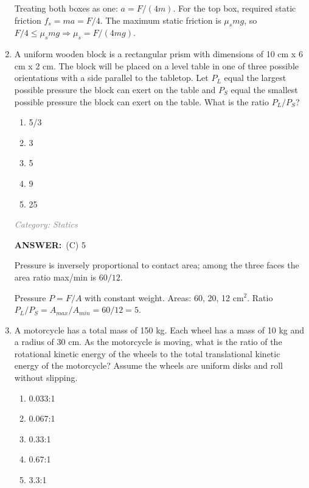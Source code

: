\documentclass[12pt, a4paper]{article}
\makeatletter
\newcommand{\finalanswer}[1]{\textbf{ANSWER:}~#1}
\newif\if@categoryprinted
\newcommand{\category}[1]{\if@categoryprinted\relax\else\textit{\textcolor{gray}{Category: #1}}\global\@categoryprintedtrue\fi}
\newcommand{\tags}[1]{}
\makeatother
\begin{document}
\begin{CJK*}{UTF8}{gbsn}
\begin{enumerate}[itemsep=1.0em, topsep=0.6em]
\begin{solutionbox}
Treating both boxes as one: $a=F/(4m)$. For the top box, required static friction $f_s=m a=F/4$. The maximum static friction is $\mu_s mg$, so $F/4\le \mu_s mg \Rightarrow \mu_s=F/(4mg)$.
\end{solutionbox}

\newpage

\item \label{prob:37}
A uniform wooden block is a rectangular prism with dimensions of 10 cm x 6 cm x 2 cm. The block will be placed on a level table in one of three possible orientations with a side parallel to the tabletop. Let $P_L$ equal the largest possible pressure the block can exert on the table and $P_S$ equal the smallest possible pressure the block can exert on the table. What is the ratio $P_L/P_S$? 
\begin{enumerate}[label=(\Alph*)]
    \item 5/3
    \item 3
    \item 5
    \item 9
    \item 25
\end{enumerate}

\category{Statics} \tags{}
\begin{answerbox}
\finalanswer{(C) 5}
\end{answerbox}
\begin{insightbox}
Pressure is inversely proportional to contact area; among the three faces the area ratio max/min is $60/12$.
\end{insightbox}
\begin{solutionbox}

Pressure $P=F/A$ with constant weight. Areas: 60, 20, 12 cm$^2$. Ratio $P_L/P_S=A_{max}/A_{min}=60/12=5$.
\end{solutionbox}

\item \label{prob:38}
A motorcycle has a total mass of 150 kg. Each wheel has a mass of 10 kg and a radius of 30 cm. As the motorcycle is moving, what is the ratio of the rotational kinetic energy of the wheels to the total translational kinetic energy of the motorcycle? Assume the wheels are uniform disks and roll without slipping.
\begin{enumerate}[label=(\Alph*)]
    \item 0.033:1
    \item 0.067:1
    \item 0.33:1
    \item 0.67:1
    \item 3.3:1
\end{enumerate}


\end{enumerate}
\end{CJK*}
\end{document}
